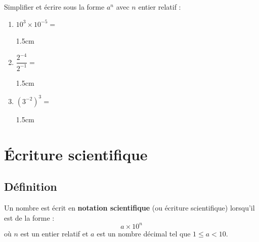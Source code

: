 \documentclass[a4paper]{book}
\begin{document}
    \begin{exemple}
        Simplifier et écrire sous la forme $a^n$ avec $n$ entier relatif :
        \begin{enumerate}
            \item $10^3 \times 10^{-5} = $
            \begin{ZoneReponse}{1.5cm}
            \end{ZoneReponse}

            \item $\dfrac{2^{-4}}{2^{-1}} = $
            \begin{ZoneReponse}{1.5cm}
            \end{ZoneReponse}

            \item $\left(3^{-2}\right)^3 = $
            \begin{ZoneReponse}{1.5cm}
            \end{ZoneReponse}
        \end{enumerate}
    \end{exemple}


\section{Écriture scientifique}

\subsection{Définition}

    \begin{definition}
        Un nombre est écrit en \textbf{notation scientifique} (ou écriture scientifique) lorsqu'il est de la forme :
        \[
            a \times 10^n
        \]
        où $n$ est un entier relatif et $a$ est un nombre décimal tel que $1 \leq a < 10$.
    \end{definition}
\end{document}
